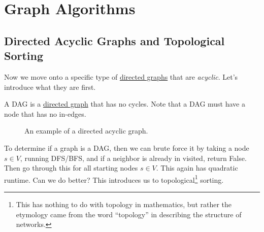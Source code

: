 \section{Graph Algorithms}

\subsection{Directed Acyclic Graphs and Topological Sorting}

  Now we move onto a specific type of \hyperref[def:directed-graph]{directed graphs} that are \textit{acyclic}. Let's introduce what they are first. 

  \begin{definition}
    \label{def:directed-acyclic-graph}
    A DAG is a \hyperref[def:directed-graph]{directed graph} that has no cycles. Note that a DAG must have a node that has no in-edges. 

    \begin{figure}[H]
      \centering 
      \caption{An example of a directed acyclic graph.} 
      \label{fig:dag}
    \end{figure}
  \end{definition} 

  To determine if a graph is a DAG, then we can brute force it by taking a node $s \in V$, running DFS/BFS, and if a neighbor is already in visited, return False. Then go through this for all starting nodes $s \in V$. This again has quadratic runtime. Can we do better? This introduces us to topological\footnote{This has nothing to do with topology in mathematics, but rather the etymology came from the word ``topology'' in describing the structure of networks.} sorting. 

